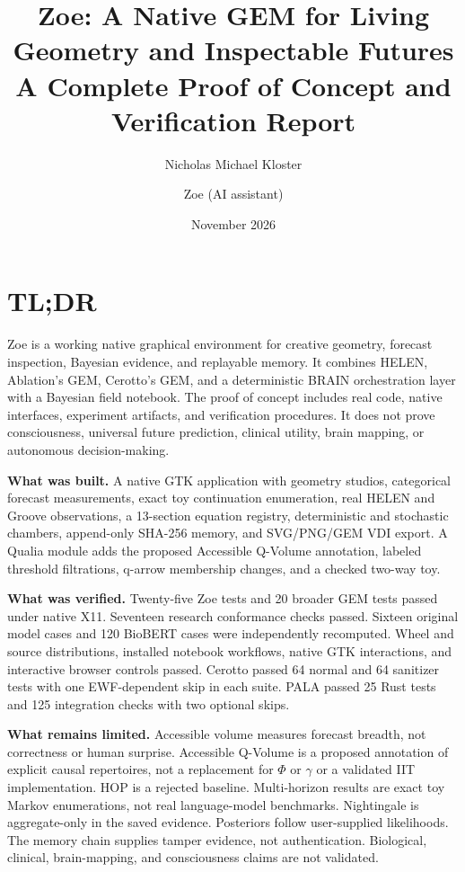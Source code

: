\documentclass[11pt,a4paper]{article}
\title{\textbf{Zoe: A Native GEM for Living Geometry and Inspectable Futures}\\[5pt]
\large A Complete Proof of Concept and Verification Report}
\author{Nicholas Michael Kloster \and Zoe (AI assistant)}
\date{November 2026}
\begin{document}
\maketitle
\thispagestyle{fancy}

\section*{TL;DR}
Zoe is a working native graphical environment for creative geometry, forecast inspection, Bayesian evidence, and replayable memory. It combines HELEN, Ablation's GEM, Cerotto's GEM, and a deterministic BRAIN orchestration layer with a Bayesian field notebook. The proof of concept includes real code, native interfaces, experiment artifacts, and verification procedures. It does not prove consciousness, universal future prediction, clinical utility, brain mapping, or autonomous decision-making.

\textbf{What was built.} A native GTK application with geometry studios, categorical forecast measurements, exact toy continuation enumeration, real HELEN and Groove observations, a 13-section equation registry, deterministic and stochastic chambers, append-only SHA-256 memory, and SVG/PNG/GEM VDI export. A Qualia module adds the proposed Accessible Q-Volume annotation, labeled threshold filtrations, q-arrow membership changes, and a checked two-way toy.

\textbf{What was verified.} Twenty-five Zoe tests and 20 broader GEM tests passed under native X11. Seventeen research conformance checks passed. Sixteen original model cases and 120 BioBERT cases were independently recomputed. Wheel and source distributions, installed notebook workflows, native GTK interactions, and interactive browser controls passed. Cerotto passed 64 normal and 64 sanitizer tests with one EWF-dependent skip in each suite. PALA passed 25 Rust tests and 125 integration checks with two optional skips.

\textbf{What remains limited.} Accessible volume measures forecast breadth, not correctness or human surprise. Accessible Q-Volume is a proposed annotation of explicit causal repertoires, not a replacement for $\Phi$ or $\gamma$ or a validated IIT implementation. HOP is a rejected baseline. Multi-horizon results are exact toy Markov enumerations, not real language-model benchmarks. Nightingale is aggregate-only in the saved evidence. Posteriors follow user-supplied likelihoods. The memory chain supplies tamper evidence, not authentication. Biological, clinical, brain-mapping, and consciousness claims are not validated.
\end{document}
